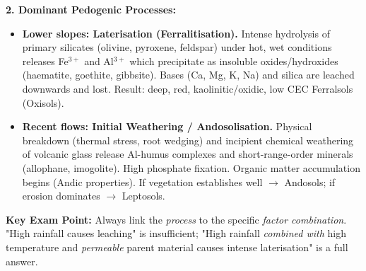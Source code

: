 \documentclass[11pt]{article}
\begin{document}
\begin{exoresolu}
\noindent\textbf{2. Dominant Pedogenic Processes:}
\begin{itemize}
\item \textbf{Lower slopes: Laterisation (Ferralitisation).} Intense hydrolysis of primary silicates (olivine, pyroxene, feldspar) under hot, wet conditions releases Fe$^{3+}$ and Al$^{3+}$ which precipitate as insoluble oxides/hydroxides (haematite, goethite, gibbsite). Bases (Ca, Mg, K, Na) and silica are leached downwards and lost. Result: deep, red, kaolinitic/oxidic, low CEC Ferralsols (Oxisols).
\item \textbf{Recent flows: Initial Weathering / Andosolisation.} Physical breakdown (thermal stress, root wedging) and incipient chemical weathering of volcanic glass release Al-humus complexes and short-range-order minerals (allophane, imogolite). High phosphate fixation. Organic matter accumulation begins (Andic properties). If vegetation establishes well $\rightarrow$ Andosols; if erosion dominates $\rightarrow$ Leptosols.
\end{itemize}

\noindent\textbf{Key Exam Point:} Always link the \emph{process} to the specific \emph{factor combination}. "High rainfall causes leaching" is insufficient; "High rainfall \emph{combined with} high temperature and \emph{permeable} parent material causes intense laterisation" is a full answer.
\end{exoresolu}
\end{document}

